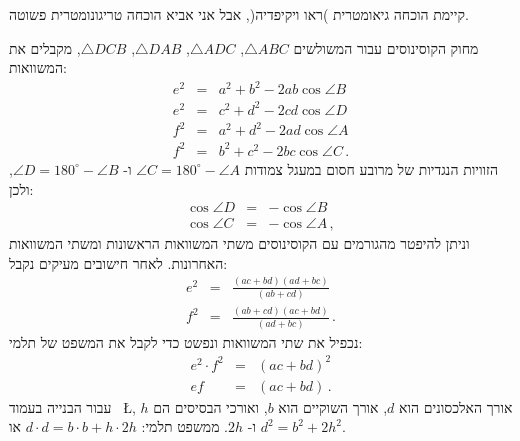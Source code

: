 \begin{center}

\end{center}
קיימת הוכחה גיאומטרית )ראו ויקיפדיה(, אבל אני אביא הוכחה טריגונומטרית פשוטה.


מחוק הקוסינוסים עבור המשולשים
$\triangle ABC$, $\triangle ADC$, $\triangle DAB$, $\triangle DCB$,
מקבלים את המשוואות:
\begin{eqnarray*}
e^2 &=& a^2 + b^2 - 2ab \cos \angle B\\
e^2 &=& c^2 + d^2 - 2cd \cos \angle D\\
f^2 &=& a^2 + d^2 - 2ad \cos \angle A\\
f^2 &=& b^2 + c^2 - 2bc \cos \angle C\,.
\end{eqnarray*}
הזוויות הנגדיות של מרובע חסום במעגל צמודות
$\angle C = 180^\circ - \angle A$
ו-%
$\angle D = 180^\circ - \angle B$,
ולכן:
\begin{eqnarray*}
\cos \angle D &=& - \cos \angle B\\
\cos \angle C &=& -\cos \angle A\,,
\end{eqnarray*}
וניתן להיפטר מהגורמים עם הקוסינוסים משתי המשוואות הראשונות ומשתי המשוואות האחרונות. לאחר חישובים מעיקים נקבל:
\begin{eqnarray*}
e^2 &=& \frac{(ac+bd)(ad+bc)}{(ab+cd)}\\
f^2 &=& \frac{(ab+cd)(ac+bd)}{(ad+bc)}\,.
\end{eqnarray*}
נכפיל את שתי המשוואות ונפשט כדי לקבל את המשפט של תלמי:
\begin{eqnarray*}
e^2\cdot f^2 &=& (ac+bd)^2\\
ef &=& (ac+bd)\,. 
\end{eqnarray*}
עבור הבנייה בעמוד~%
\L{\pageref{p.ptolemy}},
אורך האלכסונים הוא
$d$,
אורך השוקיים הוא
$b$,
ואורכי הבסיסים הם
$h$
ו-%
$2h$.
ממשפט תלמי:
$d\cdot d = b\cdot b + h\cdot 2h$
או
$d^2=b^2+2h^2$.

